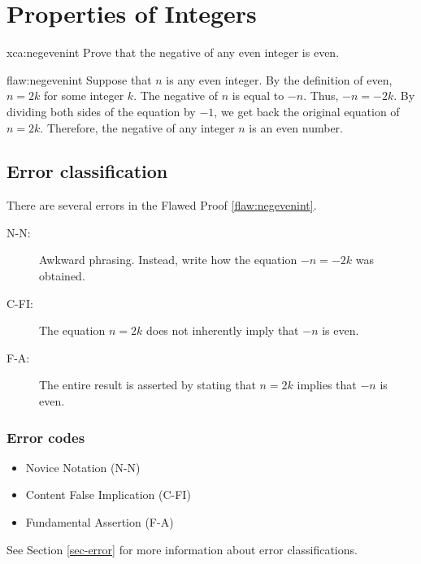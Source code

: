 \section{Properties of Integers}

\begin{xca}{xca:negevenint}
Prove that the negative of any even integer is even. 
\end{xca}

\begin{flaw}{flaw:negevenint}
Suppose that $n$ is any even integer. By the definition of even, $n=2k$ for some integer $k$. The negative of $n$ is equal to $-n$. Thus, $-n = -2k.$ By dividing both sides of the equation by $-1$, we get back the original equation of $n=2k$. Therefore, the negative of any integer $n$ is an even number. 
\end{flaw}

\clearpage
\subsection{Error classification}


There are several errors
 in the Flawed Proof \ref{flaw:negevenint}. 
 
\begin{description}
 	\item[N-N:] Awkward phrasing. Instead, write how the equation $-n=-2k$ was obtained.	
 	\item[C-FI:] The equation $n=2k$ does not inherently imply that $-n$ is even.
 	\item [F-A:] The entire result is asserted by stating that $n=2k$ implies that $-n$ is even.
 \end{description}

 
\subsubsection{Error codes}
\begin{itemize}
	\item 	Novice Notation (N-N)
	\item   Content False Implication (C-FI)
	\item   Fundamental Assertion (F-A)
\end{itemize}
See Section \ref{sec-error} for more information about error classifications.

